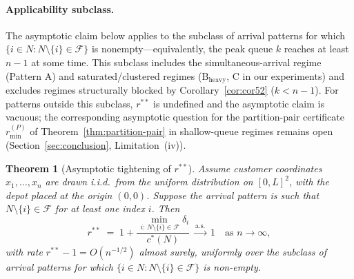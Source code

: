 \documentclass[11pt]{article}
\theoremstyle{plain}
\newtheorem{theorem}{Theorem}
\theoremstyle{definition}
\theoremstyle{remark}
\newcommand{\F}{\mathcal{F}}
\newcommand{\cstar}{c^{\ast}}
\begin{document}
\paragraph{Applicability subclass.} The asymptotic claim below applies to the subclass of arrival patterns for which $\{i \in N : N\setminus\{i\}\in\F\}$ is nonempty---equivalently, the peak queue $k$ reaches at least $n-1$ at some time. This subclass includes the simultaneous-arrival regime (Pattern A) and saturated/clustered regimes ($\text{B}_{\text{heavy}}$, C in our experiments) and excludes regimes structurally blocked by Corollary~\ref{cor:cor52} ($k<n-1$). For patterns outside this subclass, $r^{\ast\ast}$ is undefined and the asymptotic claim is vacuous; the corresponding asymptotic question for the partition-pair certificate $r^{(P)}_{\min}$ of Theorem~\ref{thm:partition-pair} in shallow-queue regimes remains open (Section~\ref{sec:conclusion}, Limitation~(iv)).

\begin{theorem}[Asymptotic tightening of $r^{\ast\ast}$]
\label{thm:asymptotic}
Assume customer coordinates $x_1,\ldots,x_n$ are drawn i.i.d.\ from the uniform distribution on $[0,L]^2$, with the depot placed at the origin $(0,0)$. Suppose the arrival pattern is such that $N\setminus\{i\}\in\F$ for at least one index $i$. Then
\[
r^{\ast\ast} \;=\; 1 + \frac{\min_{\,i:\,N\setminus\{i\}\in\F} \delta_i}{\cstar(N)}\;\xrightarrow{\text{a.s.}}\; 1 \quad \text{as } n\to\infty,
\]
with rate $r^{\ast\ast}-1 = O(n^{-1/2})$ almost surely, uniformly over the subclass of arrival patterns for which $\{i \in N : N\setminus\{i\}\in\F\}$ is non-empty.
\end{theorem}
\end{document}
